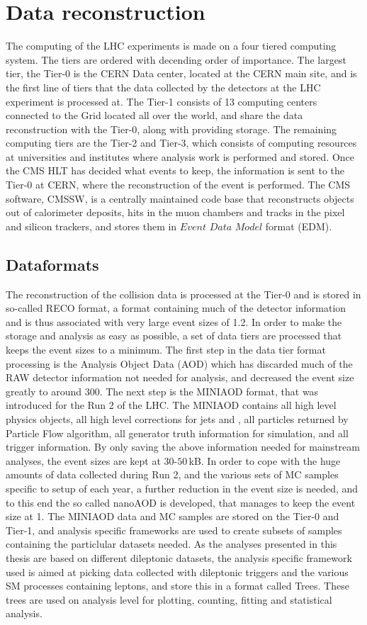\section{Data reconstruction}
\noindent\justify
The computing of the LHC experiments is made on a four tiered computing system. The tiers are ordered with decending order of importance. 
The largest tier, the Tier-0 is the CERN Data center, located at the CERN main site, and is the first line of tiers that the data collected by the detectors at the LHC experiment is processed at. 
The Tier-1 consists of 13 computing centers connected to the Grid located all over the world, and share the data reconstruction with the Tier-0, along with providing storage.
The remaining computing tiers are the Tier-2 and Tier-3, which consists of computing resources at universities and institutes where analysis work is performed and stored. 
Once the CMS HLT has decided what events to keep, the information is sent to the Tier-0 at CERN, where the reconstruction of the event is performed. 
The CMS software, CMSSW, is a centrally maintained code base that reconstructs objects out of calorimeter deposits, hits in the muon chambers and tracks in the pixel and silicon trackers, and stores them in $Event$ $Data$ $Model$ format (EDM).    
\subsection*{Dataformats}
\noindent\justify
The reconstruction of the collision data is processed at the Tier-0 and is stored in so-called RECO format, a format containing much of the detector information and is thus associated with very large event sizes of 1.2\MB.
In order to make the storage and analysis as easy as possible, a set of data tiers are processed that keeps the event sizes to a minimum.
The first step in the data tier format processing is the Analysis Object Data (AOD) which has discarded much of the RAW detector information not needed for analysis, and decreased the event size greatly to around 300\kB.
The next step is the MINIAOD format, that was introduced for the Run 2 of the LHC.
The MINIAOD contains all high level physics objects, all high level corrections for jets and \ptmiss, all particles returned by Particle Flow algorithm, all generator truth information for simulation, and all trigger information.
By only saving the above information needed for mainstream analyses, the event sizes are kept at $30$-$50\,$kB.
In order to cope with the huge amounts of data collected during Run 2, and the various sets of MC samples specific to setup of each year, a further reduction in the event size is needed, and to this end the so called nanoAOD is developed, that manages to keep the event size at 1\kB.
The MINIAOD data and MC samples are stored on the Tier-0 and Tier-1, and analysis specific frameworks are used to create subsets of samples containing the particlular datasets needed.
As the analyses presented in this thesis are based on different dileptonic datasets, the analysis specific framework used is aimed at picking data collected with dileptonic triggers and the various SM processes containing leptons, and store this in a format called Trees.
These trees are used on analysis level for plotting, counting, fitting and statistical analysis.
